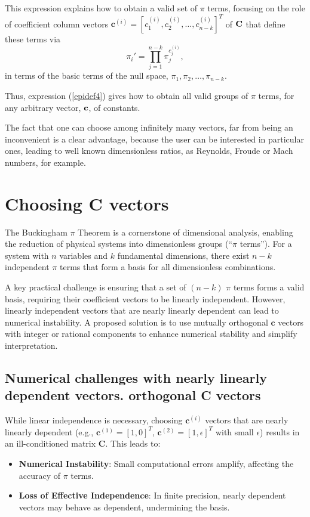 This expression explains how to obtain a valid set of $\pi$  terms, focusing on the role of coefficient column vectors $\mathbf{c}^{(i)} = [c_1^{(i)}, c_2^{(i)}, \ldots, c_{n-k}^{(i)}]^T$ of ${\bf C}$ that define these terms via
\begin{equation}\label{epidef4}
\boxed{\pi_i' = \prod_{j=1}^{n-k}\pi_j^{c_j^{(i)}},}
\end{equation}
in terms of the basic terms of the null space, $\pi_1, \pi_2, \ldots, \pi_{n-k}$.

Thus, expression (\ref{epidef4}) gives how to obtain all valid groups of $\pi$ terms, for any arbitrary vector, ${\bf c}$, of constants.

The fact that one can choose among  infinitely many vectors, far from being an inconvenient is a clear advantage, because the user can be interested in particular ones, leading to well known dimensionless ratios, as Reynolds, Froude or Mach numbers, for example.

\section[Choosing ${\bf C}$ vectors]{Choosing C vectors}

The Buckingham $\pi$ Theorem is a cornerstone of dimensional analysis, enabling the reduction of physical systems into dimensionless groups (``$\pi$ terms''). For a system with $n$ variables and $k$ fundamental dimensions, there exist $n - k$ independent $\pi$ terms that form a basis for all dimensionless combinations.

A key practical challenge is ensuring that a set of $(n - k)$ $\pi$ terms forms a valid basis, requiring their coefficient vectors to be linearly independent. However, linearly independent vectors that are nearly linearly dependent can lead to numerical instability. A proposed solution is to use mutually orthogonal $\mathbf{c}$ vectors with integer or rational components to enhance numerical stability and simplify interpretation.

\subsection{Numerical challenges with nearly linearly dependent vectors. orthogonal {\bf{C}} vectors}

While linear independence is necessary, choosing $\mathbf{c}^{(i)}$ vectors that are nearly linearly dependent (e.g., $\mathbf{c}^{(1)} = [1, 0]^T$, $\mathbf{c}^{(2)} = [1, \epsilon]^T$ with small $\epsilon$) results in an ill-conditioned matrix $\mathbf{C}$. This leads to:
\begin{itemize}
    \item \textbf{Numerical Instability}: Small computational errors amplify, affecting the accuracy of $\pi$ terms.
    \item \textbf{Loss of Effective Independence}: In finite precision, nearly dependent vectors may behave as dependent, undermining the basis.
\end{itemize}

